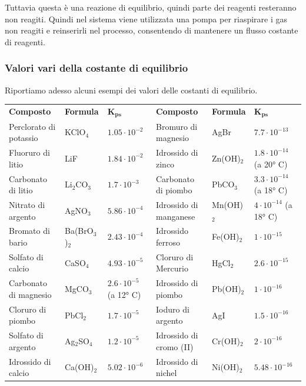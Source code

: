 Tuttavia questa è una reazione di equilibrio, quindi parte dei reagenti resteranno non reagiti. Quindi nel sistema viene utilizzata una pompa per riaspirare i gas non reagiti e reinserirli nel processo, consentendo di mantenere un flusso costante di reagenti.
\newpage
\subsubsection{Valori vari della costante di equilibrio}

Riportiamo adesso alcuni esempi dei valori delle costanti di equilibrio.

\vspace{0.5cm}\hspace{-0.5cm}\scriptsize\begin{tabular}{p{3.4cm}p{1.6cm}p{2.5cm}p{3.4cm}p{1.6cm}p{2.5cm}}
    \textbf{Composto} & \textbf{Formula} & $\boldsymbol{K_{ps}}$ & \textbf{Composto} & \textbf{Formula} & $\boldsymbol{K_{ps}}$\\[0.7ex]
    Perclorato di potassio & KClO$_4$ & $1.05 \cdot 10^{-2}$ & Bromuro di magnesio & AgBr & $7.7 \cdot 10^{-13}$\\[0.7ex]
    Fluoruro di litio & LiF & $1.84 \cdot 10^{-2}$ & Idrossido di zinco & Zn(OH)$_2$ & $1.8 \cdot 10^{-14}$ (a 20° C)\\[0.7ex]
    Carbonato di litio & Li$_2$CO$_3$ & $1.7 \cdot 10^{-3}$ & Carbonato di piombo & PbCO$_3$ & $3.3 \cdot 10^{-14}$ (a 18° C)\\[0.7ex]
    Nitrato di argento & AgNO$_3$ & $5.86 \cdot 10^{-4}$ & Idrossido di manganese & Mn(OH)$_2$ & $4 \cdot 10^{-14}$ (a 18° C)\\[0.7ex]
    Bromato di bario & Ba(BrO$_3$)$_2$ & $2.43 \cdot 10^{-4}$ & Idrossido ferroso & Fe(OH)$_2$ & $1 \cdot 10^{-15}$ \\[0.7ex]
    Solfato di calcio & CaSO$_4$ & $4.93 \cdot 10^{-5}$ & Cloruro di Mercurio & HgCl$_2$ & $2.6 \cdot 10^{-15}$\\[0.7ex]
    Carbonato di magnesio & MgCO$_3$ & $2.6 \cdot 10^{-5}$ (a 12° C) & Idrossido di piombo & Pb(OH)$_2$ & $1 \cdot 10^{-16}$\\[0.7ex]
    Cloruro di piombo & PbCl$_2$ & $1.7 \cdot 10^{-5}$ & Ioduro di argento & AgI & $1.5 \cdot 10^{-16}$\\[0.7ex]
    Solfato di argento & Ag$_2$SO$_4$ & $1.2 \cdot 10^{-5}$ & Idrossido di cromo (II) & Cr(OH)$_2$ & $2 \cdot 10^{-16}$ \\[0.7ex]
    Idrossido di calcio & Ca(OH)$_2$ & $5.02 \cdot 10^{-6}$ & Idrossido di nichel & Ni(OH)$_2$ & $5.48 \cdot 10^{-16}$ \\[0.7ex]

\end{tabular}
